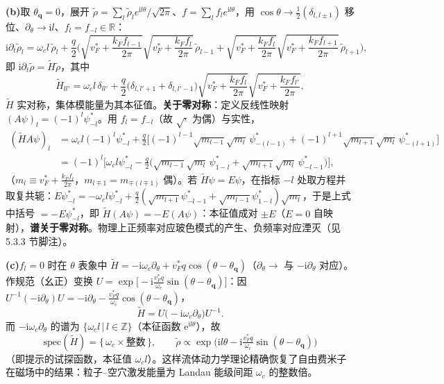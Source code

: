 \textbf{(b)}取 $\theta_{\pmb q}=0$，展开 $\tilde\rho=\sum_l\tilde\rho_le^{\mathrm{i}l\theta}/\sqrt{2\pi}$、$f=\sum_lf_le^{\mathrm{i}l\theta}$，用 $\cos\theta\to\frac12(\delta_{l,l\pm1})$ 移位、$\partial_\theta\to\mathrm{i}l$、$f_l=f_{-l}\in\mathbb{R}$：
\begin{equation*}
\mathrm{i}\partial_t\tilde\rho_l
=\omega_c l\,\tilde\rho_l
+\frac{q}{2}\Big(\sqrt{v_F^{*}+\frac{k_Ff_{l-1}}{2\pi}}\sqrt{v_F^{*}+\frac{k_Ff_{l}}{2\pi}}\,\tilde\rho_{l-1}
+\sqrt{v_F^{*}+\frac{k_Ff_{l}}{2\pi}}\sqrt{v_F^{*}+\frac{k_Ff_{l+1}}{2\pi}}\,\tilde\rho_{l+1}\Big),
\end{equation*}
即 $\mathrm{i}\partial_t\tilde\rho=\tilde H\tilde\rho$，其中
\begin{equation*}
\tilde H_{ll'}=\omega_cl\,\delta_{ll'}
+\frac{q}{2}\big(\delta_{l,l'+1}+\delta_{l,l'-1}\big)
\sqrt{v_F^{*}+\frac{k_Ff_l}{2\pi}}\sqrt{v_F^{*}+\frac{k_Ff_{l'}}{2\pi}} ,
\end{equation*}
$\tilde H$ 实对称，集体模能量为其本征值。\textbf{关于零对称}：定义反线性映射 $(A\psi)_l=(-1)^{l}\psi^{*}_{-l}$。用 $f_l=f_{-l}$（故 $\sqrt{\cdot}$ 为偶）与实性，
\begin{align*}
(\tilde HA\psi)_l
&=\omega_cl(-1)^{l}\psi^{*}_{-l}
+\frac{q}{2}\big[(-1)^{l-1}\sqrt{m_{l-1}}\sqrt{m_l}\,\psi^{*}_{-(l-1)}
+(-1)^{l+1}\sqrt{m_{l+1}}\sqrt{m_l}\,\psi^{*}_{-(l+1)}\big]\\
&=(-1)^{l}\Big[\omega_cl\psi^{*}_{-l}
-\frac{q}{2}\big(\sqrt{m_{l-1}}\sqrt{m_l}\,\psi^{*}_{1-l}+\sqrt{m_{l+1}}\sqrt{m_l}\,\psi^{*}_{-l-1}\big)\Big],
\end{align*}
（$m_l\equiv v_F^{*}+\frac{k_Ff_l}{2\pi}$，$m_{l\mp1}=m_{\mp(l\mp1)}$ 偶）。若 $\tilde H\psi=E\psi$，在指标 $-l$ 处取方程并取复共轭：$E\psi^{*}_{-l}=-\omega_cl\psi^{*}_{-l}+\frac{q}{2}(\sqrt{m_{l+1}}\psi^{*}_{-l-1}+\sqrt{m_{l-1}}\psi^{*}_{1-l})\sqrt{m_l}$，于是上式中括号 $=-E\psi^{*}_{-l}$，即 $\tilde H(A\psi)=-E(A\psi)$：本征值成对 $\pm E$（$E=0$ 自映射），\textbf{谱关于零对称}。物理上正频率对应玻色模式的产生、负频率对应湮灭（见 5.3.3 节脚注）。

\textbf{(c)}$f_l=0$ 时在 $\theta$ 表象中 $\tilde H=-\mathrm{i}\omega_c\partial_\theta+v_F^{*}q\cos(\theta-\theta_{\pmb q})$（$\partial_\theta\to$ 与 $-\mathrm{i}\partial_\theta$ 对应）。作规范（幺正）变换 $U=\exp\!\big[-\mathrm{i}\frac{v_F^{*}q}{\omega_c}\sin(\theta-\theta_{\pmb q})\big]$：因 $U^{-1}(-\mathrm{i}\partial_\theta)U=-\mathrm{i}\partial_\theta-\frac{v_F^{*}q}{\omega_c}\cos(\theta-\theta_{\pmb q})$，
\begin{equation*}
\tilde H=U\big(-\mathrm{i}\omega_c\partial_\theta\big)U^{-1} .
\end{equation*}
而 $-\mathrm{i}\omega_c\partial_\theta$ 的谱为 $\{\omega_cl\,|\,l\in\mathbb{Z}\}$（本征函数 $\mathrm{e}^{\mathrm{i}l\theta}$），故
\begin{equation*}
\boxed{\;\mathrm{spec}(\tilde H)=\{\,\omega_c\times\text{整数}\,\},\qquad
\tilde\rho\propto\exp\big(\mathrm{i}l\theta-\mathrm{i}\tfrac{v_F^{*}q}{\omega_c}\sin(\theta-\theta_{\pmb q})\big)\;}
\end{equation*}
（即提示的试探函数，本征值 $\omega_cl$）。这样流体动力学理论精确恢复了自由费米子在磁场中的结果：粒子--空穴激发能量为 Landau 能级间距 $\omega_c$ 的整数倍。

